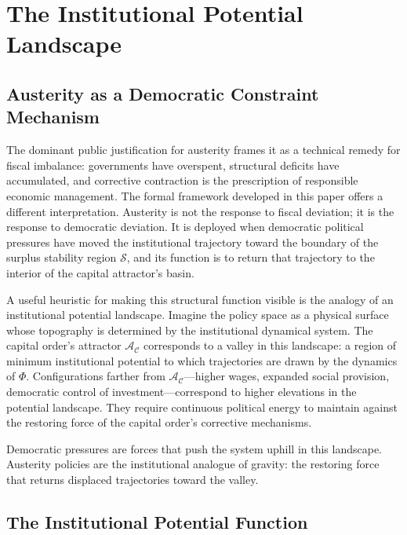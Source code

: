 \documentclass[12pt,a4paper]{article}
\theoremstyle{definition}
\theoremstyle{remark}
\begin{document}
\section{The Institutional Potential Landscape}
\label{sec:potential}

\subsection{Austerity as a Democratic Constraint Mechanism}

The dominant public justification for austerity frames it as a technical remedy for fiscal imbalance: governments have overspent, structural deficits have accumulated, and corrective contraction is the prescription of responsible economic management. The formal framework developed in this paper offers a different interpretation. Austerity is not the response to fiscal deviation; it is the response to democratic deviation. It is deployed when democratic political pressures have moved the institutional trajectory toward the boundary of the surplus stability region $\mathcal{S}$, and its function is to return that trajectory to the interior of the capital attractor's basin.

A useful heuristic for making this structural function visible is the analogy of an institutional potential landscape. Imagine the policy space as a physical surface whose topography is determined by the institutional dynamical system. The capital order's attractor $\mathcal{A}_\mathcal{C}$ corresponds to a valley in this landscape: a region of minimum institutional potential to which trajectories are drawn by the dynamics of $\Phi$. Configurations farther from $\mathcal{A}_\mathcal{C}$---higher wages, expanded social provision, democratic control of investment---correspond to higher elevations in the potential landscape. They require continuous political energy to maintain against the restoring force of the capital order's corrective mechanisms.

Democratic pressures are forces that push the system uphill in this landscape. Austerity policies are the institutional analogue of gravity: the restoring force that returns displaced trajectories toward the valley.

\subsection{The Institutional Potential Function}
\end{document}
